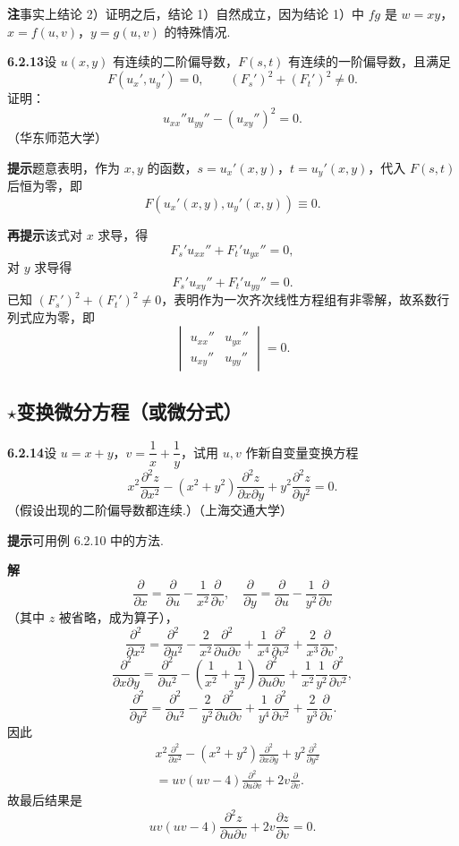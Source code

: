 \documentclass[UTF8,12pt,a4paper,fontset=fandol]{ctexart}
\begin{document}
\noindent\textbf{注}\quad 事实上结论 2）证明之后，结论 1）自然成立，因为结论 1）中 $fg$ 是 $w=xy$，$x=f(u,v)$，$y=g(u,v)$ 的特殊情况.

\noindent\textbf{6.2.13}\quad 设 $u(x,y)$ 有连续的二阶偏导数，$F(s,t)$ 有连续的一阶偏导数，且满足
\[
  F(u_x',u_y')=0,\qquad (F_s')^2+(F_t')^2\ne0.
\]
证明：
\[
  u_{xx}''u_{yy}''-(u_{xy}'')^2=0.
\]
（华东师范大学）

\noindent\textbf{提示}\quad 题意表明，作为 $x,y$ 的函数，$s=u_x'(x,y)$，$t=u_y'(x,y)$，代入 $F(s,t)$ 后恒为零，即
\[
  F(u_x'(x,y),u_y'(x,y))\equiv0.
\]

\noindent\textbf{再提示}\quad 该式对 $x$ 求导，得
\[
  F_s'u_{xx}''+F_t'u_{yx}''=0,
\]
对 $y$ 求导得
\[
  F_s'u_{xy}''+F_t'u_{yy}''=0.
\]
已知 $(F_s')^2+(F_t')^2\ne0$，表明作为一次齐次线性方程组有非零解，故系数行列式应为零，即
\[
  \begin{vmatrix}
  u_{xx}''&u_{yx}''\\
  u_{xy}''&u_{yy}''
  \end{vmatrix}=0.
\]

\subsection*{\ensuremath{\star}变换微分方程（或微分式）}

\noindent\textbf{6.2.14}\quad 设 $u=x+y$，$v=\dfrac1x+\dfrac1y$，试用 $u,v$ 作新自变量变换方程
\[
  x^2\frac{\partial^2z}{\partial x^2}
  -(x^2+y^2)\frac{\partial^2z}{\partial x\partial y}
  +y^2\frac{\partial^2z}{\partial y^2}=0.
\]
（假设出现的二阶偏导数都连续.）（上海交通大学）

\noindent\textbf{提示}\quad 可用例 6.2.10 中的方法.

\noindent\textbf{解}\quad
\[
  \frac{\partial}{\partial x}=\frac{\partial}{\partial u}-\frac1{x^2}\frac{\partial}{\partial v},\quad
  \frac{\partial}{\partial y}=\frac{\partial}{\partial u}-\frac1{y^2}\frac{\partial}{\partial v}
\]
（其中 $z$ 被省略，成为算子），
\[
  \frac{\partial^2}{\partial x^2}
  =\frac{\partial^2}{\partial u^2}-\frac2{x^2}\frac{\partial^2}{\partial u\partial v}
  +\frac1{x^4}\frac{\partial^2}{\partial v^2}+\frac2{x^3}\frac{\partial}{\partial v},
\]
\[
  \frac{\partial^2}{\partial x\partial y}
  =\frac{\partial^2}{\partial u^2}
  -\left(\frac1{x^2}+\frac1{y^2}\right)\frac{\partial^2}{\partial u\partial v}
  +\frac1{x^2}\frac1{y^2}\frac{\partial^2}{\partial v^2},
\]
\[
  \frac{\partial^2}{\partial y^2}
  =\frac{\partial^2}{\partial u^2}-\frac2{y^2}\frac{\partial^2}{\partial u\partial v}
  +\frac1{y^4}\frac{\partial^2}{\partial v^2}+\frac2{y^3}\frac{\partial}{\partial v}.
\]
因此
\[
\begin{aligned}
&x^2\frac{\partial^2}{\partial x^2}
-(x^2+y^2)\frac{\partial^2}{\partial x\partial y}
+y^2\frac{\partial^2}{\partial y^2}\\
&=uv(uv-4)\frac{\partial^2}{\partial u\partial v}+2v\frac{\partial}{\partial v}.
\end{aligned}
\]
故最后结果是
\[
  uv(uv-4)\frac{\partial^2z}{\partial u\partial v}
  +2v\frac{\partial z}{\partial v}=0.
\]
\end{document}
